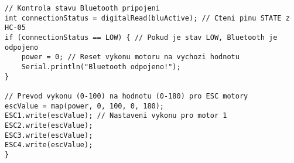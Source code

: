 \documentclass[12pt]{report}
\begin{document}
\begin{appendices}
\begin{lstlisting}[title={}, caption={}, label={}, basicstyle=\footnotesize\ttfamily, inputencoding=utf8]
// Kontrola stavu Bluetooth pripojeni
int connectionStatus = digitalRead(bluActive); // Cteni pinu STATE z HC-05
if (connectionStatus == LOW) { // Pokud je stav LOW, Bluetooth je odpojeno
	power = 0; // Reset vykonu motoru na vychozi hodnotu
	Serial.println("Bluetooth odpojeno!");
}

// Prevod vykonu (0-100) na hodnotu (0-180) pro ESC motory
escValue = map(power, 0, 100, 0, 180); 
ESC1.write(escValue); // Nastaveni vykonu pro motor 1
ESC2.write(escValue);
ESC3.write(escValue);
ESC4.write(escValue);
}	
\end{lstlisting}  
\end{appendices}
\end{document}
